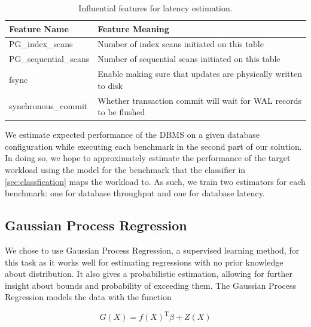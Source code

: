 \begin{table}[h!]
  \centering
  \begin{adjustbox}{max width=\linewidth}
    \begin{tabular}{ll}
      \toprule
      Feature Name          & Feature Meaning                                                    \\
      \midrule
      PG\_index\_scans      & Number of index scans initiated on this table                      \\
      PG\_sequential\_scans & Number of sequential scans initiated on this table                 \\
      fsync                 & Enable making sure that updates are physically written to disk     \\
      synchronous\_commit   & Whether transaction commit will wait for WAL records to be flushed \\
      \bottomrule
    \end{tabular}
  \end{adjustbox}

  \caption{Influential features for latency estimation.}
  \label{tab:influential_features_for_latency}
\end{table}

We estimate expected performance of the DBMS on a given database configuration
while executing each benchmark in the second part of our solution. 
In doing so, we hope to approximately estimate the performance of the target
workload using the model for the benchmark that the classifier in 
\cref{sec:classfication} maps the workload to.
As such, we train two estimators for each benchmark: one for database 
throughput and one for database latency.

\subsection{Gaussian Process Regression}
\label{sec:gp}

We chose to use Gaussian Process Regression, a supervised learning
method, for this task as it works well for estimating regressions with
no prior knowledge about distribution. It also gives a probabilistic
estimation, allowing for further insight about bounds and probability
of exceeding them. The Gaussian Process Regression models the data
with the function

\begin{equation*}
G(X) = f(X)^{\textrm{T}}\beta + Z(X)
\end{equation*}

